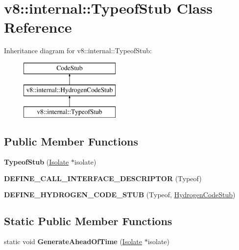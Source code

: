\hypertarget{classv8_1_1internal_1_1_typeof_stub}{}\section{v8\+:\+:internal\+:\+:Typeof\+Stub Class Reference}
\label{classv8_1_1internal_1_1_typeof_stub}
Inheritance diagram for v8\+:\+:internal\+:\+:Typeof\+Stub\+:\begin{figure}[H]
\begin{center}
\leavevmode
\includegraphics[height=3.000000cm]{classv8_1_1internal_1_1_typeof_stub}
\end{center}
\end{figure}
\subsection*{Public Member Functions}
\begin{DoxyCompactItemize}
\item 
{\bfseries Typeof\+Stub} (\hyperlink{classv8_1_1internal_1_1_isolate}{Isolate} $\ast$isolate)\hypertarget{classv8_1_1internal_1_1_typeof_stub_add16ba64218fba11a3be1ba44bf0e1af}{}\label{classv8_1_1internal_1_1_typeof_stub_add16ba64218fba11a3be1ba44bf0e1af}

\item 
{\bfseries D\+E\+F\+I\+N\+E\+\_\+\+C\+A\+L\+L\+\_\+\+I\+N\+T\+E\+R\+F\+A\+C\+E\+\_\+\+D\+E\+S\+C\+R\+I\+P\+T\+OR} (Typeof)\hypertarget{classv8_1_1internal_1_1_typeof_stub_a1c88163ea848c05151ca7925c3de4338}{}\label{classv8_1_1internal_1_1_typeof_stub_a1c88163ea848c05151ca7925c3de4338}

\item 
{\bfseries D\+E\+F\+I\+N\+E\+\_\+\+H\+Y\+D\+R\+O\+G\+E\+N\+\_\+\+C\+O\+D\+E\+\_\+\+S\+T\+UB} (Typeof, \hyperlink{classv8_1_1internal_1_1_hydrogen_code_stub}{Hydrogen\+Code\+Stub})\hypertarget{classv8_1_1internal_1_1_typeof_stub_a0fb798756997e6a63d5f23de5f7d2d95}{}\label{classv8_1_1internal_1_1_typeof_stub_a0fb798756997e6a63d5f23de5f7d2d95}

\end{DoxyCompactItemize}
\subsection*{Static Public Member Functions}
\begin{DoxyCompactItemize}
\item 
static void {\bfseries Generate\+Ahead\+Of\+Time} (\hyperlink{classv8_1_1internal_1_1_isolate}{Isolate} $\ast$isolate)\hypertarget{classv8_1_1internal_1_1_typeof_stub_ab00470d7203359d5ddfa4b654c202840}{}\label{classv8_1_1internal_1_1_typeof_stub_ab00470d7203359d5ddfa4b654c202840}

\end{DoxyCompactItemize}
